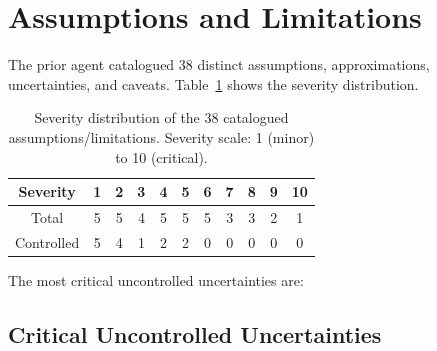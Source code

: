 \documentclass[a4paper,11pt]{article}
\begin{document}
\section{Assumptions and Limitations}

The prior agent catalogued 38 distinct assumptions, approximations, uncertainties, and caveats. Table~\ref{tab:severity} shows the severity distribution.

\begin{table}[htbp]
\centering
\caption{Severity distribution of the 38 catalogued assumptions/limitations. Severity scale: 1 (minor) to 10 (critical).}
\label{tab:severity}
\begin{tabular}{ccccccccccc}
\toprule
Severity & 1 & 2 & 3 & 4 & 5 & 6 & 7 & 8 & 9 & 10 \\
\midrule
Total & 5 & 5 & 4 & 5 & 5 & 5 & 3 & 3 & 2 & 1 \\
Controlled & 5 & 4 & 1 & 2 & 2 & 0 & 0 & 0 & 0 & 0 \\
\bottomrule
\end{tabular}
\end{table}

The most critical uncontrolled uncertainties are:

\subsection{Critical Uncontrolled Uncertainties}
\end{document}
